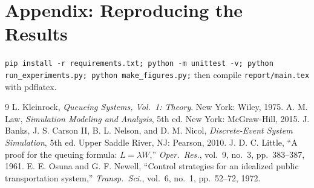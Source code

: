 \documentclass[10pt,twocolumn,letterpaper]{article}
\begin{document}
\section*{Appendix: Reproducing the Results}
\texttt{pip install -r requirements.txt; python -m unittest -v; python run\_experiments.py; python make\_figures.py;} then compile \texttt{report/main.tex} with pdflatex.

\begin{thebibliography}{9}\footnotesize
{} L. Kleinrock, \emph{Queueing Systems, Vol.\ 1: Theory}. New York: Wiley, 1975.
 A. M. Law, \emph{Simulation Modeling and Analysis}, 5th ed. New York: McGraw-Hill, 2015.
 J. Banks, J. S. Carson II, B. L. Nelson, and D. M. Nicol, \emph{Discrete-Event System Simulation}, 5th ed. Upper Saddle River, NJ: Pearson, 2010.
 J. D. C. Little, ``A proof for the queuing formula: $L=\lambda W$,'' \emph{Oper.\ Res.}, vol.\ 9, no.\ 3, pp.\ 383--387, 1961.
 E. E. Osuna and G. F. Newell, ``Control strategies for an idealized public transportation system,'' \emph{Transp.\ Sci.}, vol.\ 6, no.\ 1, pp.\ 52--72, 1972.
\end{thebibliography}
\end{document}
